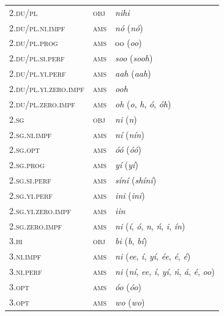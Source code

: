 \begin{xltabular}{\textwidth}{llX}
 2.\textsc{du}/\textsc{pl} & \textsc{obj} & \textit{nihi}\\
 2.\textsc{du}/\textsc{pl}.\textsc{ni}.\textsc{impf} & \textsc{ams} & \textit{nó} (\textit{nó})\\
 2.\textsc{du}/\textsc{pl}.\textsc{prog} & \textsc{ams} & oo (\textit{oo})\\
 2.\textsc{du}/\textsc{pl}.\textsc{si}.\textsc{perf} & \textsc{ams} & \textit{soo} (\textit{sooh})\\
 2.\textsc{du}/\textsc{pl}.\textsc{yi}.\textsc{perf} & \textsc{ams} & \textit{aah} (\textit{aah})\\
 2.\textsc{du}/\textsc{pl}.\textsc{yi}.\textsc{zero}.\textsc{impf}& \textsc{ams} &\textit{ooh}\\
 2.\textsc{du}/\textsc{pl}.\textsc{zero}.\textsc{impf} & \textsc{ams} & \textit{oh} (\textit{o}, \textit{h}, \textit{ó}, \textit{óh})\\
 2.\textsc{sg} & \textsc{obj} & \textit{ni} (\textit{n})\\
 2.\textsc{sg}.\textsc{ni}.\textsc{impf} & \textsc{ams} & \textit{ní} (\textit{nín})\\
 2.\textsc{sg}.\textsc{opt} & \textsc{ams} & \textit{óó} (\textit{óó})\\
 2.\textsc{sg}.\textsc{prog} & \textsc{ams} & \textit{yí} (\textit{yí})\\
 2.\textsc{sg}.\textsc{si}.\textsc{perf} & \textsc{ams} & \textit{síní} (\textit{shíní})\\
 2.\textsc{sg}.\textsc{yi}.\textsc{perf} & \textsc{ams} & \textit{ini} (\textit{ini})\\
 2.\textsc{sg}.\textsc{yi}.\textsc{zero}.\textsc{impf} & \textsc{ams} &\textit{iin}\\
 2.\textsc{sg}.\textsc{zero}.\textsc{impf} & \textsc{ams} & \textit{ni} (\textit{í}, \textit{ó}, \textit{n}, \textit{ń}, \textit{i}, \textit{ín})\\
 3.\textsc{bi} & \textsc{obj} & \textit{bi} (\textit{b}, \textit{bí})\\
 3.\textsc{ni}.\textsc{impf} & \textsc{ams} & \textit{ni} (\textit{ee}, \textit{í}, \textit{yí}, \textit{ée}, \textit{é}, \textit{é})\\
 3.\textsc{ni}.\textsc{perf} & \textsc{ams} & \textit{ni} (\textit{ní}, \textit{ee}, \textit{í}, \textit{yí}, \textit{ń}, \textit{á}, \textit{é}, \textit{oo})\\
 3.\textsc{opt} & \textsc{ams} & \textit{óo} (\textit{óo})\\
 3.\textsc{opt} & \textsc{ams} & \textit{wo} (\textit{wo})\\

\end{xltabular}
